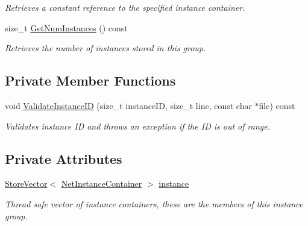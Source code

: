 \begin{DoxyCompactItemize}
\begin{DoxyCompactList}\small\item\em Retrieves a constant reference to the specified instance container. \item\end{DoxyCompactList}\item 
size\_\-t \hyperlink{class_net_instance_group_a5523c936d196006c5497e3b30027121a}{GetNumInstances} () const 
\begin{DoxyCompactList}\small\item\em Retrieves the number of instances stored in this group. \item\end{DoxyCompactList}\end{DoxyCompactItemize}
\subsection*{Private Member Functions}
\begin{DoxyCompactItemize}
\item 
void \hyperlink{class_net_instance_group_a857f9eca7d94cbb1e6b5c856113f5246}{ValidateInstanceID} (size\_\-t instanceID, size\_\-t line, const char $\ast$file) const 
\begin{DoxyCompactList}\small\item\em Validates instance ID and throws an exception if the ID is out of range. \item\end{DoxyCompactList}\end{DoxyCompactItemize}
\subsection*{Private Attributes}
\begin{DoxyCompactItemize}
\item 
\hypertarget{class_net_instance_group_ac5074081fe0e0838a90288cdeebe8eaf}{
\hyperlink{class_store_vector}{StoreVector}$<$ \hyperlink{class_net_instance_container}{NetInstanceContainer} $>$ \hyperlink{class_net_instance_group_ac5074081fe0e0838a90288cdeebe8eaf}{instance}}
\label{class_net_instance_group_ac5074081fe0e0838a90288cdeebe8eaf}

\begin{DoxyCompactList}\small\item\em Thread safe vector of instance containers, these are the members of this instance group. \item\end{DoxyCompactList}\end{DoxyCompactItemize}


